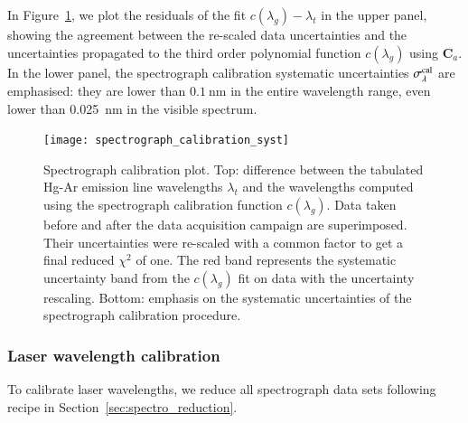 In Figure~\ref{fig:spectro_calib_syst}, we plot the residuals of the fit $c(\lambda_g)-\lambda_t$ in the upper panel, showing the agreement between the re-scaled data uncertainties and the uncertainties propagated to the third order polynomial function $c(\lambda_g)$ using $\mathbf{C}_a$. In the lower panel, the spectrograph calibration systematic uncertainties $\sigma_\lambda^{\rm cal}$ are emphasised: they are lower than $\SI{0.1}{\nm}$ in the entire wavelength range, even lower than \SI{0.025}{\nm} in the visible spectrum.


\begin{figure}[!h]
\centering
\texttt{[image: spectrograph\_calibration\_syst]}
\caption{Spectrograph calibration plot. Top: difference between the tabulated Hg-Ar emission line wavelengths $\lambda_t$ and the wavelengths computed using the spectrograph calibration function $c(\lambda_g)$. Data taken before and after the data acquisition campaign are superimposed. Their uncertainties were re-scaled with a common factor to get a final reduced $\chi^2$ of one. The red band represents the systematic uncertainty band from the $c(\lambda_g)$ fit on data with the uncertainty rescaling. Bottom: emphasis on the systematic uncertainties of the spectrograph calibration procedure.}\label{fig:spectro_calib_syst}
\end{figure}


\subsubsection{Laser wavelength calibration}


To calibrate laser wavelengths, we reduce all spectrograph data sets following recipe in Section~\ref{sec:spectro_reduction}.

